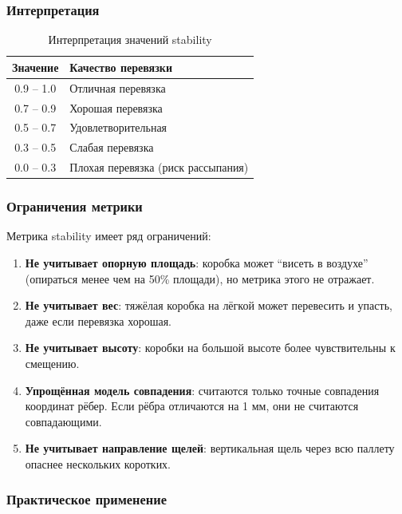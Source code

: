\subsubsection{Интерпретация}

\begin{table}[ht]
\centering
\caption{Интерпретация значений stability}
\begin{tabular}{|c|l|}
\hline
\textbf{Значение} & \textbf{Качество перевязки} \\
\hline
0.9 -- 1.0 & Отличная перевязка \\
0.7 -- 0.9 & Хорошая перевязка \\
0.5 -- 0.7 & Удовлетворительная \\
0.3 -- 0.5 & Слабая перевязка \\
0.0 -- 0.3 & Плохая перевязка (риск рассыпания) \\
\hline
\end{tabular}
\end{table}

\subsubsection{Ограничения метрики}

Метрика stability имеет ряд ограничений:

\begin{enumerate}
    \item \textbf{Не учитывает опорную площадь}: коробка может ``висеть в воздухе'' (опираться менее чем на 50\% площади), но метрика этого не отражает.
    
    \item \textbf{Не учитывает вес}: тяжёлая коробка на лёгкой может перевесить и упасть, даже если перевязка хорошая.
    
    \item \textbf{Не учитывает высоту}: коробки на большой высоте более чувствительны к смещению.
    
    \item \textbf{Упрощённая модель совпадения}: считаются только точные совпадения координат рёбер. Если рёбра отличаются на 1 мм, они не считаются совпадающими.
    
    \item \textbf{Не учитывает направление щелей}: вертикальная щель через всю паллету опаснее нескольких коротких.
\end{enumerate}

\subsubsection{Практическое применение}

